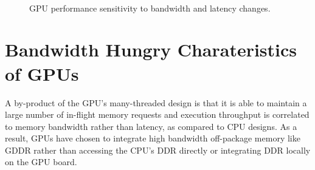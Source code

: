 \begin{figure}[t]
    \centering
    \\
    \caption{GPU performance sensitivity to bandwidth and latency changes.}
    \label{fig:bwlatencysensitivity}
\end{figure}

\section{Bandwidth Hungry Charateristics of GPUs}
\label{heterogeneous_background}
A by-product of the GPU's many-threaded design is that it is able to maintain a
large number of in-flight memory requests and execution throughput is correlated
to memory bandwidth rather than latency, as compared to CPU designs.  As a
result, GPUs have chosen to integrate high bandwidth off-package memory like
GDDR rather than accessing the CPU's DDR directly or integrating DDR locally on
the GPU board. 


